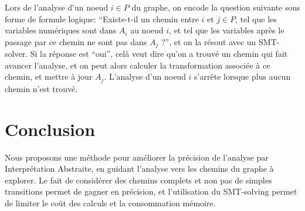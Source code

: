 \documentclass{llncs}
\begin{document}
Lors de l'analyse d'un noeud $i \in P$ du graphe, on encode la question suivante
sous forme de formule logique: ``Existe-t-il un chemin entre $i$ et $j \in P$,
tel que les variables numériques sont dans $A_i$ au noeud $i$, et tel que les
variables après le passage par ce chemin ne sont pas dans $A_j$ ?'', et on la
résout avec un SMT-solver. Si la réponse est ``oui'', celà veut dire qu'on a
trouvé un chemin qui fait avancer l'analyse, et on peut alors calculer la
transformation associée à ce chemin, et mettre à jour $A_j$. L'analyse d'un
noeud $i$ s'arrête lorsque plus aucun chemin n'est trouvé.

\section{Conclusion}

Nous proposons une méthode pour améliorer la précision de l'analyse par
Interprétation Abstraite, en guidant l'analyse vers les chemins du graphe à
explorer. Le fait de considérer des chemins complets et non pas de simples
transitions permet de gagner en précision, et l'utilisation du SMT-solving
permet de limiter le coût des calculs et la consommation mémoire.
\end{document}

